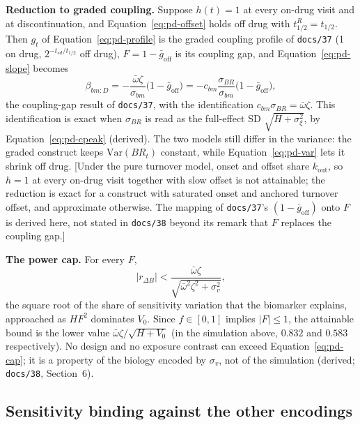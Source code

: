 \documentclass[11pt]{article}
\newcommand{\note}[1]{\textcolor{blue!60!black}{\small [#1]}}
\newcommand{\code}[1]{\texttt{#1}}
\begin{document}
\textbf{Reduction to graded coupling.} Suppose $h(t) = 1$ at every
on-drug visit and at discontinuation, and Equation~\eqref{eq:pd-offset}
holds off drug with $t_{1/2}^{R} = t_{1/2}$. Then $g_t$ of
Equation~\eqref{eq:pd-profile} is the graded coupling profile of
\code{docs/37} (1 on drug, $2^{-t_{sd}/t_{1/2}}$ off drug),
$F = 1 - \bar g_{\text{off}}$ is its coupling gap, and
Equation~\eqref{eq:pd-slope} becomes
\begin{equation}
\beta_{bm:D} = -\frac{\bar\omega\zeta}{\sigma_{bm}}
  \big(1 - \bar g_{\text{off}}\big)
  = -c_{bm}\frac{\sigma_{BR}}{\sigma_{bm}}\big(1 - \bar g_{\text{off}}\big),
\label{eq:pd-graded}
\end{equation}
the coupling-gap result of \code{docs/37}, with the identification
$c_{bm}\sigma_{BR} = \bar\omega\zeta$. This identification is exact
when $\sigma_{BR}$ is read as the full-effect SD
$\sqrt{H + \sigma_\xi^2}$, by Equation~\eqref{eq:pd-cpeak} (derived).
The two models still differ in the variance: the graded construct
keeps $\mathrm{Var}(BR_t)$ constant, while
Equation~\eqref{eq:pd-var} lets it shrink off drug. \note{Under the
pure turnover model, onset and offset share $k_{\text{out}}$, so
$h = 1$ at every on-drug visit together with slow offset is not
attainable; the reduction is exact for a construct with saturated
onset and anchored turnover offset, and approximate otherwise. The
mapping of \code{docs/37}'s $(1 - \bar g_{\text{off}})$ onto $F$ is
derived here, not stated in \code{docs/38} beyond its remark that $F$
replaces the coupling gap.}

\textbf{The power cap.} For every $F$,
\begin{equation}
|r_{\Delta B}| < \frac{\bar\omega\zeta}{\sqrt{\bar\omega^2\zeta^2
  + \sigma_v^2}},
\label{eq:pd-cap}
\end{equation}
the square root of the share of sensitivity variation that the
biomarker explains, approached as $HF^2$ dominates $V_0$. Since
$f \in [0,1]$ implies $|F| \le 1$, the attainable bound is the lower
value $\bar\omega\zeta/\sqrt{H + V_0}$ (in the simulation above,
$0.832$ and $0.583$ respectively). No design and no exposure contrast
can exceed Equation~\eqref{eq:pd-cap}; it is a property of the
biology encoded by $\sigma_v$, not of the simulation (derived;
\code{docs/38}, Section~6).

\subsection{Sensitivity binding against the other encodings}
\label{sec:inve-pd-relation}
\end{document}
